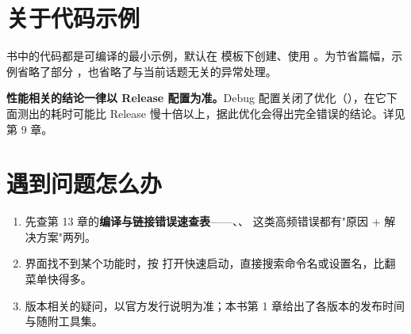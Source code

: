 \section{关于代码示例}

书中的代码都是可编译的最小示例，默认在  模板下创建、使用 。为节省篇幅，示例省略了部分 ，也省略了与当前话题无关的异常处理。

\begin{tipbox}[提示]
\textbf{性能相关的结论一律以 Release 配置为准。}Debug 配置关闭了优化（），在它下面测出的耗时可能比 Release 慢十倍以上，据此优化会得出完全错误的结论。详见第 9 章。
\end{tipbox}

\section{遇到问题怎么办}

\begin{enumerate}
	\item 先查第 13 章的\textbf{编译与链接错误速查表}——、、 这类高频错误都有"原因 + 解决方案"两列。
	\item 界面找不到某个功能时，按  打开快速启动，直接搜索命令名或设置名，比翻菜单快得多。
	\item 版本相关的疑问，以官方发行说明为准；本书第 1 章给出了各版本的发布时间与随附工具集。
\end{enumerate}
